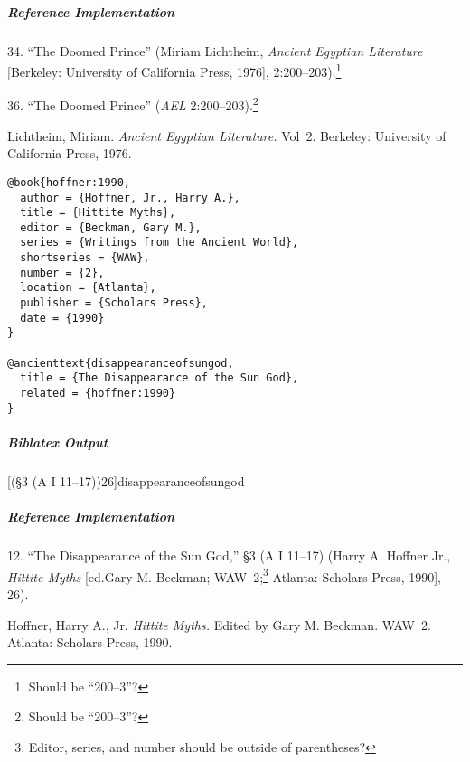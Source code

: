 \documentclass[a4paper]{article}
\newenvironment{biboutput}{%
  \subparagraph{Biblatex Output}
}{\color{black}}
\newenvironment{refimp}{%
  \subparagraph{Reference Implementation}
  \color{reference-colour}
  \rm
}{\par\color{black}}
\begin{document}
\begin{refimp}
  \hspace*{\bibindent}34. “The Doomed Prince” (Miriam Lichtheim, \emph{Ancient
  Egyptian Literature} [Berkeley: University of California Press, 1976],
  2:200–203).\footnote{Should be “200–3”?}
  
  \hspace*{\bibindent}36. “The Doomed Prince” (\emph{AEL}
  2:200–203).\footnote{Should be “200–3”?}
  
  \hangindent \bibindent Lichtheim, Miriam. \emph{Ancient Egyptian
  Literature.} Vol~2. Berkeley: University of California Press, 1976.

\end{refimp}

\medskip

\begin{lstlisting}
@book{hoffner:1990,
  author = {Hoffner, Jr., Harry A.},
  title = {Hittite Myths},
  editor = {Beckman, Gary M.},
  series = {Writings from the Ancient World},
  shortseries = {WAW},
  number = {2},
  location = {Atlanta},
  publisher = {Scholars Press},
  date = {1990}
}

@ancienttext{disappearanceofsungod,
  title = {The Disappearance of the Sun God},
  related = {hoffner:1990}
}
\end{lstlisting}

\begin{biboutput}
  [(§3 \mkbibparens{A I 11--17})26]{disappearanceofsungod}
\end{biboutput}

\begin{refimp}
  \hspace*{\bibindent}12. “The Disappearance of the Sun God,” §3 (A I 11–17)
  (Harry A. Hoffner Jr., \emph{Hittite Myths} [ed.\@ Gary M. Beckman;
  WAW~2;\footnote{Editor, series, and number should be outside of
  parentheses?} Atlanta: Scholars Press, 1990], 26).
  
  \hangindent\bibindent Hoffner, Harry A., Jr. \emph{Hittite Myths.} Edited by
  Gary M. Beckman. WAW~2. Atlanta: Scholars Press, 1990.

\end{refimp}
\end{document}
